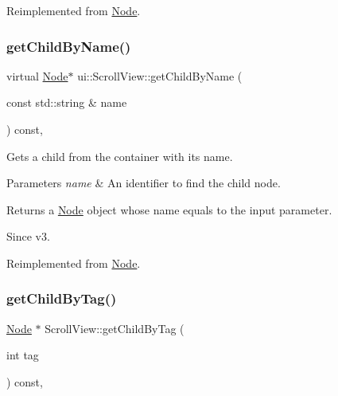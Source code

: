Reimplemented from \hyperlink{classNode_ac2f84f995c7d6581787abaa3b09c4518}{Node}.

\mbox{\label{classui_1_1ScrollView_ab61ab552b7ea1fb1ebff43f34441a876}} 
\subsubsection{\texorpdfstring{get\+Child\+By\+Name()}{getChildByName()}\hspace{0.1cm}{\footnotesize\ttfamily [2/2]}}
{\footnotesize\ttfamily virtual \hyperlink{classNode}{Node}$\ast$ ui\+::\+Scroll\+View\+::get\+Child\+By\+Name (\begin{DoxyParamCaption}\item[{const std\+::string \&}]{name }\end{DoxyParamCaption}) const\hspace{0.3cm}{\ttfamily [override]}, {\ttfamily [virtual]}}

Gets a child from the container with its name.


\begin{DoxyParams}{Parameters}
{\em name} & An identifier to find the child node.\\
\hline
\end{DoxyParams}
\begin{DoxyReturn}{Returns}
a \hyperlink{classNode}{Node} object whose name equals to the input parameter.
\end{DoxyReturn}
\begin{DoxySince}{Since}
v3. 
\end{DoxySince}


Reimplemented from \hyperlink{classNode_ac2f84f995c7d6581787abaa3b09c4518}{Node}.

\mbox{\label{classui_1_1ScrollView_a0c523b2f58f7916aa9aaf7bcab4781a7}} 
\subsubsection{\texorpdfstring{get\+Child\+By\+Tag()}{getChildByTag()}\hspace{0.1cm}{\footnotesize\ttfamily [1/2]}}
{\footnotesize\ttfamily \hyperlink{classNode}{Node} $\ast$ Scroll\+View\+::get\+Child\+By\+Tag (\begin{DoxyParamCaption}\item[{int}]{tag }\end{DoxyParamCaption}) const\hspace{0.3cm}{\ttfamily [override]}, {\ttfamily [virtual]}}

